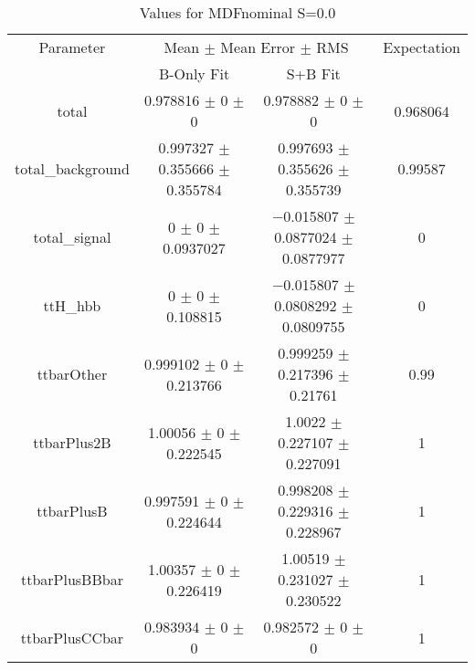 \begin{table}
\centering
\caption{Values for MDFnominal S=0.0}
\begin{tabular}{cccc}
\toprule
Parameter & \multicolumn{2}{c}{Mean $\pm$ Mean Error $\pm$ RMS} & Expectation\\
 & B-Only Fit & S+B Fit & \\
\midrule
total & \num{0.978816} $\pm$ \num{0} $\pm$ \num{0} & \num{0.978882} $\pm$ \num{0} $\pm$ \num{0} & \num{0.968064}\\
total\_background & \num{0.997327} $\pm$ \num{0.355666} $\pm$ \num{0.355784} & \num{0.997693} $\pm$ \num{0.355626} $\pm$ \num{0.355739} & \num{0.99587}\\
total\_signal & \num{0} $\pm$ \num{0} $\pm$ \num{0.0937027} & \num{-0.015807} $\pm$ \num{0.0877024} $\pm$ \num{0.0877977} & \num{0}\\
ttH\_hbb & \num{0} $\pm$ \num{0} $\pm$ \num{0.108815} & \num{-0.015807} $\pm$ \num{0.0808292} $\pm$ \num{0.0809755} & \num{0}\\
ttbarOther & \num{0.999102} $\pm$ \num{0} $\pm$ \num{0.213766} & \num{0.999259} $\pm$ \num{0.217396} $\pm$ \num{0.21761} & \num{0.99}\\
ttbarPlus2B & \num{1.00056} $\pm$ \num{0} $\pm$ \num{0.222545} & \num{1.0022} $\pm$ \num{0.227107} $\pm$ \num{0.227091} & \num{1}\\
ttbarPlusB & \num{0.997591} $\pm$ \num{0} $\pm$ \num{0.224644} & \num{0.998208} $\pm$ \num{0.229316} $\pm$ \num{0.228967} & \num{1}\\
ttbarPlusBBbar & \num{1.00357} $\pm$ \num{0} $\pm$ \num{0.226419} & \num{1.00519} $\pm$ \num{0.231027} $\pm$ \num{0.230522} & \num{1}\\
ttbarPlusCCbar & \num{0.983934} $\pm$ \num{0} $\pm$ \num{0} & \num{0.982572} $\pm$ \num{0} $\pm$ \num{0} & \num{1}\\
\bottomrule
\end{tabular}
\end{table}